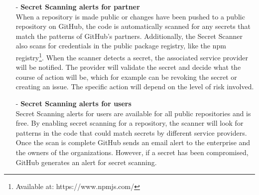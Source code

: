 \begin{itemize}
    \item [-] \textbf{Secret Scanning alerts for partner}\\
    When a repository is made public or changes have been pushed to a public repository on GitHub, the code is automatically scanned for any secrets that match the patterns of GitHub's partners. Additionally, the Secret Scanner also scans for credentials in the public package registry, like the npm registry\footnote{Available at: https://www.npmjs.com/}. When the scanner detects a secret, the associated service provider will be notified. The provider will validate the secret and decide what the course of action will be, which for example can be revoking the secret or creating an issue. The specific action will depend on the level of risk involved. 
    
    \item [-] \textbf{Secret Scanning alerts for users}\\
    Secret Scanning alerts for users are available for all public repositories and is free. By enabling secret scanning for a repository, the scanner will look for patterns in the code that could match secrets by different service providers. Once the scan is complete GitHub sends an email alert to the enterprise and the owners of the organizations. However, if a secret has been compromised, GitHub generates an alert for secret scanning. 
    
\end{itemize}



